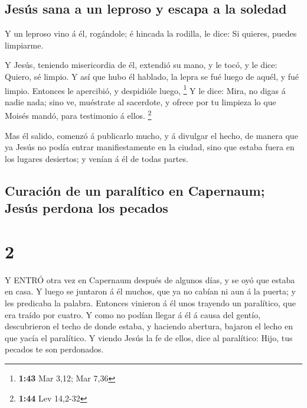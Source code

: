 \hypertarget{jesuxfas-sana-a-un-leproso-y-escapa-a-la-soledad}{%
\subsection{Jesús sana a un leproso y escapa a la
soledad}\label{jesuxfas-sana-a-un-leproso-y-escapa-a-la-soledad}}

 Y un leproso vino á él, rogándole; é hincada la rodilla,
le dice: Si quieres, puedes limpiarme.

 Y Jesús, teniendo misericordia de él, extendió su mano, y
le tocó, y le dice: Quiero, sé limpio.  Y así que hubo él
hablado, la lepra se fué luego de aquél, y fué limpio. 
Entonces le apercibió, y despidióle luego, \footnote{\textbf{1:43} Mar
  3,12; Mar 7,36}  Y le dice: Mira, no digas á nadie nada;
sino ve, muéstrate al sacerdote, y ofrece por tu limpieza lo que Moisés
mandó, para testimonio á ellos. \footnote{\textbf{1:44} Lev 14,2-32}

 Mas él salido, comenzó á publicarlo mucho, y á divulgar el
hecho, de manera que ya Jesús no podía entrar manifiestamente en la
ciudad, sino que estaba fuera en los lugares desiertos; y venían á él de
todas partes.

\hypertarget{curaciuxf3n-de-un-paraluxedtico-en-capernaum-jesuxfas-perdona-los-pecados}{%
\subsection{Curación de un paralítico en Capernaum; Jesús perdona los
pecados}\label{curaciuxf3n-de-un-paraluxedtico-en-capernaum-jesuxfas-perdona-los-pecados}}

\hypertarget{section-1}{%
\section{2}\label{section-1}}

 Y ENTRÓ otra vez en Capernaum después de algunos días, y se
oyó que estaba en casa.  Y luego se juntaron á él muchos,
que ya no cabían ni aun á la puerta; y les predicaba la palabra.
 Entonces vinieron á él unos trayendo un paralítico, que era
traído por cuatro.  Y como no podían llegar á él á causa del
gentío, descubrieron el techo de donde estaba, y haciendo abertura,
bajaron el lecho en que yacía el paralítico.  Y viendo Jesús
la fe de ellos, dice al paralítico: Hijo, tus pecados te son perdonados.

